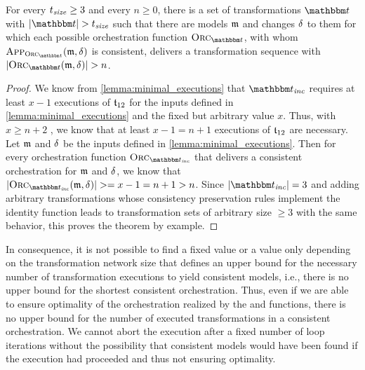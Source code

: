 \begin{theorem}
    \label{theorem:orchestration_fixed}
    For every $t_{\mathit{size}} \geq 3$ and every $n \geq 0$, there is a set of transformations $\transformationset{T}$ with $\abs{\transformationset{T}} > t_\mathvariable{size}$ such that there are models $\modeltuple{m}$ and changes $\mathfrak{\delta}_{}$ to them for which each possible orchestration function $\orcfunction{\transformationset{T}}$, with whom $\appfunction{\orcfunction{\transformationset{T}}}(\modeltuple{m}, \changetuple{})$ is consistent, delivers a transformation sequence with $\abs{\orcfunction{\transformationset{T}}(\modeltuple{m}, \changetuple{})} > n$.
\end{theorem}
\begin{proof}
    We know from \autoref{lemma:minimal_executions} that $\transformationset{T}_\mathvariable{inc}$ requires at least $x-1$ executions of $\transformation{t}_{12}$ for the inputs defined in \autoref{lemma:minimal_executions} and the fixed but arbitrary value $x$.
    Thus, with $x \geq n+2$ %
    , we know that at least $x-1 = n+1$ executions of $\transformation{t}_{12}$ are necessary.
    Let $\modeltuple{m}$ and $\mathfrak{\delta}_{}$ be the inputs defined in \autoref{lemma:minimal_executions}.
    Then for every orchestration function $\orcfunction{\transformationset{T}_\mathvariable{inc}}$ that delivers a consistent orchestration for $\modeltuple{m}$ and $\mathfrak{\delta}_{}$, we know that $\abs{\orcfunction{\transformationset{T}_\mathvariable{inc}}(\modeltuple{m}, \changetuple{})} >= x-1 = n+1 > n$.
    Since $\abs{\transformationset{T}_\mathvariable{inc}} = 3$ and adding arbitrary transformations whose consistency preservation rules implement the identity function leads to transformation sets of arbitrary size $\geq 3$ with the same behavior, this proves the theorem by example.
\end{proof}

In consequence, it is not possible to find a fixed value or a value only depending on the transformation network size that defines an upper bound for the necessary number of transformation executions to yield consistent models, i.e., there is no upper bound for the shortest consistent orchestration.
Thus, even if we are able to ensure optimality of the orchestration realized by the  and  functions, there is no upper bound for the number of executed transformations in a consistent orchestration.
We cannot abort the execution after a fixed number of loop iterations without the possibility that consistent models would have been found if the execution had proceeded and thus not ensuring optimality.

